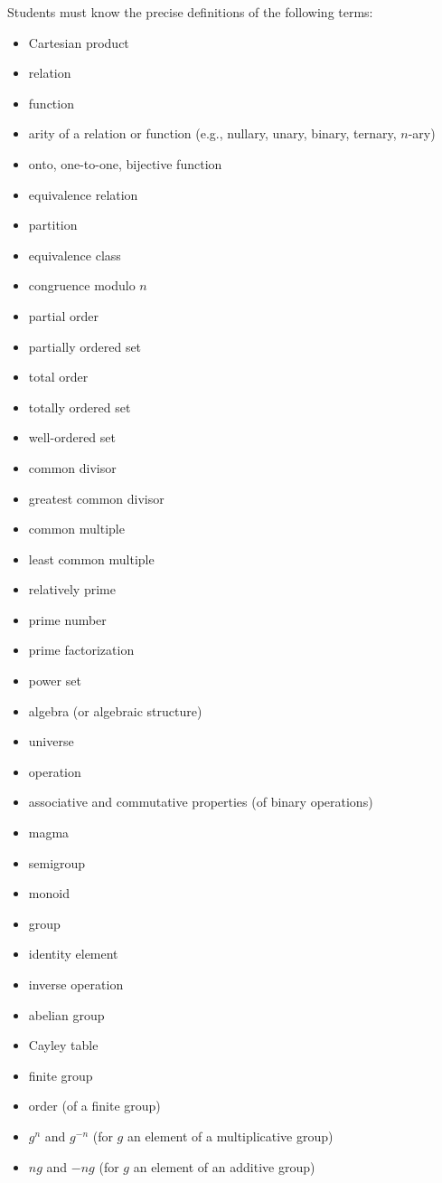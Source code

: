 \documentclass[12pt]{article}
\begin{document}
Students must know the precise definitions of the following terms:
\begin{itemize}
\item Cartesian product
\item relation
\item function
\item arity of a relation or function (e.g., nullary, unary, binary, ternary, $n$-ary)
\item onto, one-to-one, bijective function
\item equivalence relation
\item partition
\item equivalence class
\item congruence modulo $n$
\item partial order
\item partially ordered set
\item total order
\item totally ordered set
\item well-ordered set
\item common divisor
\item greatest common divisor
\item common multiple
\item least common multiple
\item relatively prime
\item prime number
\item prime factorization
\item power set
\item algebra (or algebraic structure)
\item universe
\item operation
\item associative and commutative properties (of binary operations)
\item magma
\item semigroup
\item monoid
\item group
\item identity element
\item inverse operation
\item abelian group
\item Cayley table
\item finite group
\item order (of a finite group)
\item $g^n$ and $g^{-n}$ (for $g$ an element of a multiplicative group)
\item $ng$ and $-ng$ (for $g$ an element of an additive group)

\end{itemize}
\end{document}
